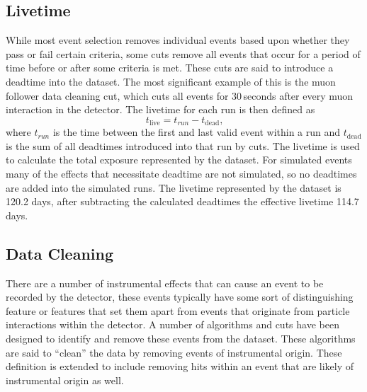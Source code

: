 \subsection{Livetime}
While most event selection removes individual events based upon whether they
pass or fail certain criteria, some cuts remove all events that occur for a
period of time before or after some criteria is met.
These cuts are said to introduce a deadtime into the dataset.
The most significant example of this is the muon follower data cleaning cut, which
cuts all events for 30\,seconds after every muon interaction in the detector.
The livetime for each run is then defined as
\begin{equation}
    t_{\mathrm{live}} = t_{run} - t_{\mathrm{dead}}\text{,}
\end{equation}
where $t_{run}$ is the time between the first and last valid event within a run
and $t_{\mathrm{dead}}$ is the sum of all deadtimes introduced into that run by cuts.
The livetime is used to calculate the total exposure represented by the dataset.
For simulated events many of the effects that necessitate deadtime are not simulated,
so no deadtimes are added into the simulated runs.
The livetime represented by the dataset is 120.2 days, after subtracting the
calculated deadtimes the effective livetime  114.7 days.

\subsection{Data Cleaning}
There are a number of instrumental effects that can cause an event
to be recorded by the detector, these events typically have some
sort of distinguishing feature or features that set them apart
from events that originate from particle interactions within the
detector.
A number of algorithms and cuts have been designed to identify and remove
these events from the dataset.
These algorithms are said to ``clean'' the data by removing events
of instrumental origin. These definition is extended to include removing
hits within an event that are likely of instrumental origin as well.

